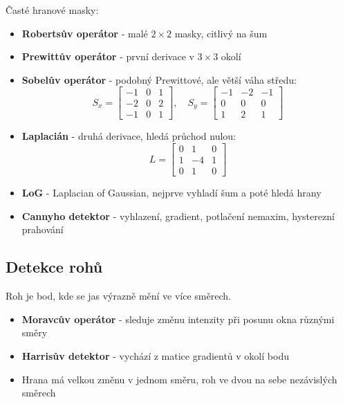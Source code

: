 Časté hranové masky:
\begin{itemize}
    \item \textbf{Robertsův operátor} - malé \(2\times2\) masky, citlivý na šum
    \item \textbf{Prewittův operátor} - první derivace v \(3\times3\) okolí
    \item \textbf{Sobelův operátor} - podobný Prewittové, ale větší váha středu:
          \[
              S_x=
              \begin{bmatrix}
                  -1&0&1\\
                  -2&0&2\\
                  -1&0&1
              \end{bmatrix},
              \quad
              S_y=
              \begin{bmatrix}
                  -1&-2&-1\\
                  0&0&0\\
                  1&2&1
              \end{bmatrix}
          \]
    \item \textbf{Laplacián} - druhá derivace, hledá průchod nulou:
          \[
              L=
              \begin{bmatrix}
                  0&1&0\\
                  1&-4&1\\
                  0&1&0
              \end{bmatrix}
          \]
    \item \textbf{LoG} - Laplacian of Gaussian, nejprve vyhladí šum a poté hledá hrany
    \item \textbf{Cannyho detektor} - vyhlazení, gradient, potlačení nemaxim, hysterezní prahování
\end{itemize}

\subsection*{Detekce rohů}
Roh je bod, kde se jas výrazně mění ve více směrech.
\begin{itemize}
    \item \textbf{Moravcův operátor} - sleduje změnu intenzity při posunu okna různými směry
    \item \textbf{Harrisův detektor} - vychází z matice gradientů v okolí bodu
    \item Hrana má velkou změnu v jednom směru, roh ve dvou na sebe nezávislých směrech
\end{itemize}

